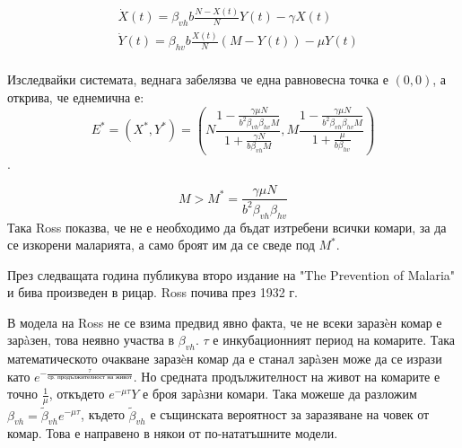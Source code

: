 \begin{equation}
  \label{eq:BasicProblem}
  \begin{split}
    &\dot{X}(t) = \beta_{vh} b \frac{N-X(t)}{N} Y(t) - \gamma X(t) \\
    &\dot{Y}(t) = \beta_{hv} b \frac{X(t)}{N} (M-Y(t)) - \mu Y(t) \\
  \end{split}
\end{equation}

Изследвайки системата, веднага забелязва че една равновесна точка е $(0,0)$, а открива, че еднемична е:
\begin{equation*}
  E^* = (X^*, Y^*) = \left(N \frac{1 - \frac{\gamma \mu N}{b^2 \beta_{vh} \beta_{hv} M}}{1 + \frac{\gamma N}{b \beta_{vh} M}}, M \frac{1 - \frac{\gamma \mu N}{b^2 \beta_{vh} \beta_{hv} M}}{1 + \frac{\mu}{b \beta_{hv}}}\right)
\end{equation*}.

\begin{equation}
  \label{eq:RossM}
  M > M^* = \frac{\gamma \mu N}{b^2 \beta_{vh} \beta_{hv}}
\end{equation}
Така Ross показва, че не е необходимо да бъдат изтребени всички комари, за да се изкорени маларията, а само броят им да се сведе под $M^*$.

През следващата година публикува второ издание на "The Prevention of Malaria" и бива произведен в рицар. Ross почива през 1932 г.

В модела на Ross не се взима предвид явно факта, че не всеки заразèн комар е зарàзен, това неявно участва в $\beta_{vh}$.
$\tau$ е инкубационният период на комарите. Така математическото очакване заразèн комар да е станал зарàзен може да се изрази като $e^{-\frac{\tau}{\text{ср. продължителност на живот}}}$. Но средната продължителност на живот на комарите е точно $\frac{1}{\mu}$, откъдето $e^{-\mu\tau}Y$ е броя зарàзни комари.
Така можеше да разложим $\beta_{vh} = \tilde{\beta}_{vh} e^{-\mu\tau}$, където $\tilde{\beta}_{vh}$ е същинската вероятност за заразяване на човек от комар. Това е направено в някои от по-нататъшните модели.

